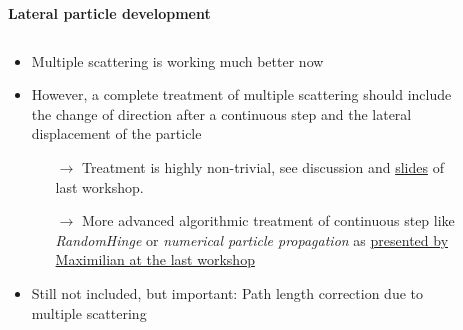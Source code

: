 \documentclass[aspectratio=1610, 9pt]{beamer}
\begin{document}
\begin{frame}

  \textbf{Lateral particle development}


    \begin{columns}[onlytextwidth]
        \begin{column}{0.5\textwidth}
            \begin{itemize}
              \item Multiple scattering is working much better now
              \item However, a complete treatment of multiple scattering should include the change of direction after a continuous step and the lateral displacement of the particle
              \begin{itemize}
                \item[$\rightarrow$] Treatment is highly non-trivial, see discussion and \href{https://indico.scc.kit.edu/event/2711/contributions/10845/attachments/5244/8030/talk.pdf}{slides} of last workshop. 
                \item[$\rightarrow$] More advanced algorithmic treatment of continuous step like \emph{RandomHinge} or \emph{numerical particle propagation} as \href{https://indico.scc.kit.edu/event/2711/contributions/10924/attachments/5269/8076/propagation.pdf}{presented by Maximilian at the last workshop} 
              \end{itemize}
              \item Still not included, but important: Path length correction due to multiple scattering
            \end{itemize}
        \end{column}
        \begin{column}{0.5\textwidth}

      \centering
      \begin{figure}
      \end{figure}


\end{column}
\end{columns}
\end{frame}
\end{document}
